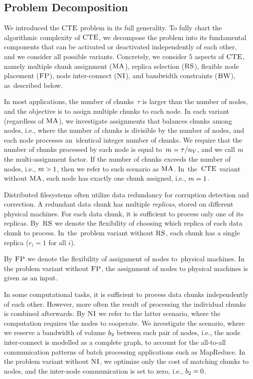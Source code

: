 \subsection{Problem Decomposition}

We introduced the $\textsc{CTE}$ problem in its full generality.
To fully chart the algorithmic complexity of $\textsc{CTE}$, we decompose the problem into its fundamental components that can be activated or deactivated independently of each other, and we consider all possible variants.
Concretely, we consider $5$ aspects of $\textsc{CTE}$, namely multiple chunk assignment ($\textsc{MA}$),
replica selection ($\textsc{RS}$), flexible node placement ($\textsc{FP}$), node inter-connect ($\textsc{NI}$),
and bandwidth constraints ($\textsc{BW}$), as~described below.

In most applications, the number of chunks~$\tau$ is larger than the number of nodes, and the objective is to assign multiple chunks to each node.
In each variant (regardless of $\textsc{MA}$), we investigate assignments that balances chunks among nodes, i.e., where the number of chunks is divisible by the number of nodes, and each node processes an~identical integer number of chunks.
We require that the number of chunks processed by each node is equal to~$m = \tau / n_V$, and we call $m$ the multi-assignment factor.
If the number of chunks exceeds the number of nodes, i.e., $m > 1$, then we refer to such scenario as $\textsc{MA}$.
In~the~$\textsc{CTE}$ variant without $\textsc{MA}$, each node has exactly one chunk assigned, i.e., $m = 1$.

Distributed filesystems often utilize data redundancy for corruption detection and correction.
A redundant data chunk has multiple \emph{replicas}, stored on different physical machines.
For each data chunk, it is sufficient to process only one of its replicas.
By~$\textsc{RS}$ we denote the flexibility of choosing which replica of each data chunk to process.
In~the~problem variant without $\textsc{RS}$, each chunk has a single replica ($r_i = 1$ for all $i$).

By $\textsc{FP}$ we denote the flexibility of assignment of nodes to~physical machines.
In the problem variant without $\textsc{FP}$, the assignment of nodes to physical machines is given as an input.

In some computational tasks, it is sufficient to process data chunks independently of each other.
However, more often the result of processing the individual chunks is combined afterwards.
By $\textsc{NI}$ we refer to the latter scenario, where the computation requires the nodes to cooperate.
We investigate the scenario, where we reserve a bandwidth of volume $b_2$ between each pair of nodes, i.e., the node inter-connect is modelled as a complete graph, to account for the all-to-all communication patterns of batch processing applications such as MapReduce.
In the problem variant without $\textsc{NI}$, we optimize only the cost of matching chunks to nodes, and the inter-node communication is set to zero, i.e., $b_2 = 0$.

